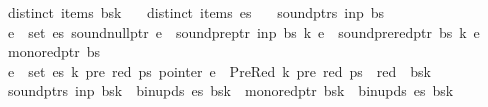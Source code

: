 \begin{isabellebody}
\ \ \ {\isachardoublequoteopen}distinct\ {\isacharparenleft}{\kern0pt}items\ {\isacharparenleft}{\kern0pt}bs{\isacharbang}{\kern0pt}k{\isacharparenright}{\kern0pt}{\isacharparenright}{\kern0pt}{\isachardoublequoteclose}\isanewline
\ \ \ {\isachardoublequoteopen}distinct\ {\isacharparenleft}{\kern0pt}items\ es{\isacharparenright}{\kern0pt}{\isachardoublequoteclose}\isanewline
\ \ \ {\isachardoublequoteopen}sound{\isacharunderscore}{\kern0pt}ptrs\ inp\ bs{\isachardoublequoteclose}\isanewline
\ \ \ {\isachardoublequoteopen}{\isasymforall}e\ {\isasymin}\ set\ es{\isachardot}{\kern0pt}\ sound{\isacharunderscore}{\kern0pt}null{\isacharunderscore}{\kern0pt}ptr\ e\ {\isasymand}\ sound{\isacharunderscore}{\kern0pt}pre{\isacharunderscore}{\kern0pt}ptr\ inp\ bs\ k\ e\ {\isasymand}\ sound{\isacharunderscore}{\kern0pt}prered{\isacharunderscore}{\kern0pt}ptr\ bs\ k\ e{\isachardoublequoteclose}\isanewline
\ \ \ {\isachardoublequoteopen}mono{\isacharunderscore}{\kern0pt}red{\isacharunderscore}{\kern0pt}ptr\ bs{\isachardoublequoteclose}\isanewline
\ \ \ {\isachardoublequoteopen}{\isasymforall}e\ {\isasymin}\ set\ es{\isachardot}{\kern0pt}\ {\isasymforall}k{\isacharprime}{\kern0pt}\ pre\ red\ ps{\isachardot}{\kern0pt}\ pointer\ e\ {\isacharequal}{\kern0pt}\ PreRed\ {\isacharparenleft}{\kern0pt}k{\isacharprime}{\kern0pt}{\isacharcomma}{\kern0pt}\ pre{\isacharcomma}{\kern0pt}\ red{\isacharparenright}{\kern0pt}\ ps\ {\isasymlongrightarrow}\ red\ {\isacharless}{\kern0pt}\ {\isacharbar}{\kern0pt}bs{\isacharbang}{\kern0pt}k{\isacharbar}{\kern0pt}{\isachardoublequoteclose}\isanewline
\ \ \ {\isachardoublequoteopen}sound{\isacharunderscore}{\kern0pt}ptrs\ inp\ {\isacharparenleft}{\kern0pt}bs{\isacharbrackleft}{\kern0pt}k\ {\isacharcolon}{\kern0pt}{\isacharequal}{\kern0pt}\ bin{\isacharunderscore}{\kern0pt}upds\ es\ {\isacharparenleft}{\kern0pt}bs{\isacharbang}{\kern0pt}k{\isacharparenright}{\kern0pt}{\isacharbrackright}{\kern0pt}{\isacharparenright}{\kern0pt}\ {\isasymand}\ mono{\isacharunderscore}{\kern0pt}red{\isacharunderscore}{\kern0pt}ptr\ {\isacharparenleft}{\kern0pt}bs{\isacharbrackleft}{\kern0pt}k\ {\isacharcolon}{\kern0pt}{\isacharequal}{\kern0pt}\ bin{\isacharunderscore}{\kern0pt}upds\ es\ {\isacharparenleft}{\kern0pt}bs{\isacharbang}{\kern0pt}k{\isacharparenright}{\kern0pt}{\isacharbrackright}{\kern0pt}{\isacharparenright}{\kern0pt}{\isachardoublequoteclose}%
\isadelimproof
%
\endisadelimproof
%
\isatagproof
%
\endisatagproof
{\isafoldproof}%

\end{isabellebody}
